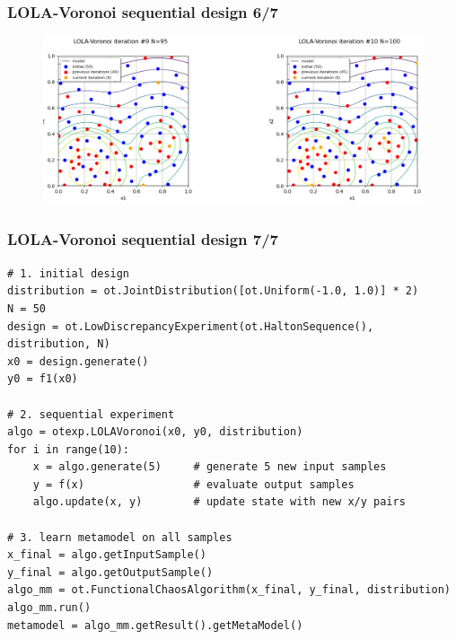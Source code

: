 \documentclass[aspectratio=169]{beamer}
\begin{document}

\begin{frame}
\frametitle{LOLA-Voronoi sequential design 6/7}

\begin{figure}
   \includegraphics[width=1.0\textwidth]{figures/lolavoronoi_5}
\end{figure}

\end{frame}


\begin{frame}[containsverbatim]
\frametitle{LOLA-Voronoi sequential design 7/7}

\begin{small}
\lstset{language=python}
\begin{lstlisting}
# 1. initial design
distribution = ot.JointDistribution([ot.Uniform(-1.0, 1.0)] * 2)
N = 50
design = ot.LowDiscrepancyExperiment(ot.HaltonSequence(), distribution, N)
x0 = design.generate()
y0 = f1(x0)

# 2. sequential experiment
algo = otexp.LOLAVoronoi(x0, y0, distribution)
for i in range(10):
    x = algo.generate(5)     # generate 5 new input samples
    y = f(x)                 # evaluate output samples
    algo.update(x, y)        # update state with new x/y pairs

# 3. learn metamodel on all samples
x_final = algo.getInputSample()
y_final = algo.getOutputSample()
algo_mm = ot.FunctionalChaosAlgorithm(x_final, y_final, distribution)
algo_mm.run()
metamodel = algo_mm.getResult().getMetaModel()
\end{lstlisting}
\end{small}


\end{frame}

\end{document}

